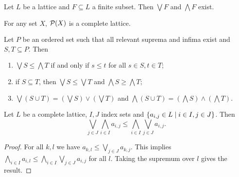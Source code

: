 \begin{lemma} \label{supInfFiniteSubsetsLattice}
Let $L$ be a lattice and $F\subseteq L$ a finite subset. Then $\bigvee F$ and $\bigwedge F$ exist. 
\end{lemma}

\begin{example}
For any set $X$, $\operatorname{\mathcal{P}}(X)$ is a complete lattice.
\end{example}

\begin{lemma}
Let $P$ be an ordered set such that all relevant suprema and infima exist and $S,T\subseteq P$. Then
\begin{enumerate}
\item $\bigvee S \leq \bigwedge T$ if and only if $s\leq t$ for all $s\in S,t\in T$;
\item if $S\subseteq T$, then $\bigvee S \leq \bigvee T$ and $\bigwedge S \geq \bigwedge T$;
\item $\bigvee(S\cup T) = \left(\bigvee S\right)\vee \left(\bigvee T\right)$ and $\bigwedge(S\cup T) = \left(\bigwedge S\right)\wedge \left(\bigwedge T\right)$.
\end{enumerate}
\end{lemma}

\begin{proposition}
Let $L$ be a complete lattice, $I,J$ index sets and $\left\{ a_{i,j}\in L \;\middle|\; i\in I, j\in J \right\}$. Then
\[ \bigvee_{j\in J}\bigwedge_{i\in I}a_{i,j} \leq \bigwedge_{i\in I}\bigvee_{j\in J} a_{i,j}. \]
\end{proposition}
\begin{proof}
For all $k,l$ we have $a_{k,l}\leq \bigvee_{j\in J} a_{k,j}$. This implies $\bigwedge_{i\in I} a_{i,l} \leq \bigwedge_{i\in I}\bigvee_{j\in J} a_{i,j}$ for all $l$. Taking the supremum over $l$ gives the result.
\end{proof}

